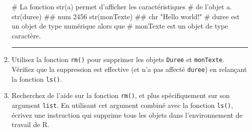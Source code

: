 \documentclass[12pt,twosided, notitlepage]{book}
\newenvironment{Shaded}{}{}
\newcommand{\KeywordTok}[1]{\textcolor[rgb]{0.00,0.00,1.00}{#1}}
\newcommand{\CommentTok}[1]{\textcolor[rgb]{0.00,0.50,0.00}{#1}}
\newcommand{\NormalTok}[1]{#1}
\newif \ifsol
\renewenvironment{Shaded}{\begin{snugshade}}{\end{snugshade}}
\begin{document}
\begin{enumerate}
\begin{Shaded}
\begin{Highlighting}[]
\CommentTok{# La fonction str(a) permet d'afficher les caractéristiques}
\CommentTok{# de l'objet a.}
\KeywordTok{str}\NormalTok{(duree)}
\NormalTok{  ##  num 2456}
\KeywordTok{str}\NormalTok{(monTexte)}
\NormalTok{  ##  chr "Hello world!"}
\CommentTok{# duree est un objet de type numérique alors que}
\CommentTok{# monTexte est un objet de type caractère.}
\end{Highlighting}
\end{Shaded}

  \begin{center} \rule{0.5\linewidth}{\linethickness}\end{center}

  \bigskip  \fi 
\item
  Utilisez la fonction \texttt{rm()} pour supprimer
  les objets \texttt{Duree} et \texttt{monTexte}. Vérifiez que la
  suppression est effective (et n'a pas affecté \texttt{duree}) en
  relançant la fonction \texttt{ls()}.

  \ifsol 

  \begin{center} \rule{0.5\linewidth}{\linethickness}\end{center}

\begin{Shaded}
\begin{Highlighting}[]
\CommentTok{# Objets présents au début de la question}
\KeywordTok{ls}\NormalTok{()}
\NormalTok{  ## [1] "duree"    "Duree"    "min"      "monTexte" "sec"}

\CommentTok{# La fonction rm() (de l'anglais remove) permet de supprimer }
\CommentTok{# un ou plusieurs objets.}
\KeywordTok{rm}\NormalTok{(Duree, monTexte)}
\KeywordTok{ls}\NormalTok{()}
\NormalTok{  ## [1] "duree" "min"   "sec"}
\CommentTok{# Les objets Duree et monTexte ont bien été supprimés.}
\end{Highlighting}
\end{Shaded}

  \begin{center} \rule{0.5\linewidth}{\linethickness}\end{center}

  \bigskip  \fi 
\item
  Recherchez de l'aide sur la fonction \texttt{rm()},
  et plus spécifiquement sur son argument \texttt{list}. En utilisant
  cet argument combiné avec la fonction
  \texttt{ls()}, écrivez une instruction qui supprime
  tous les objets dans l'environnement de travail de R.


\end{enumerate}
\end{document}
